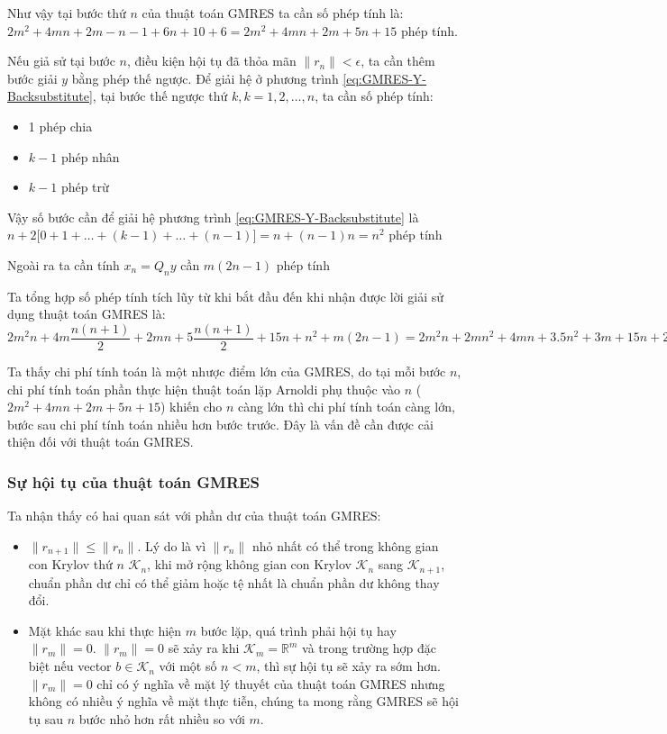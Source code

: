\documentclass[14pt, a4paper]{article}
\numberwithin{equation}{section}
\numberwithin{algorithm}{section}
\numberwithin{figure}{section}
\numberwithin{dl}{section}
\numberwithin{md}{section}
\numberwithin{bd}{section}
\begin{document}
Như vậy tại bước thứ $n$ của thuật toán GMRES ta cần số phép tính là: $2m^2+4mn+2m-n-1 + 6n+10 + 6=2m^2+4mn+2m+5n+15$ phép tính.

Nếu giả sử tại bước $n$, điều kiện hội tụ đã thỏa mãn $\lVert r_n \rVert < \epsilon$, ta cần thêm bước giải $y$ bằng phép thế ngược. Để giải hệ ở phương trình \ref{eq:GMRES-Y-Backsubstitute}, tại bước thế ngược thứ $k, k=1,2,\dots,n$, ta cần số phép tính:
\begin{itemize}
    \item 1 phép chia
    \item $k-1$ phép nhân
    \item $k-1$ phép trừ
\end{itemize}

Vậy số bước cần để giải hệ phương trình \ref{eq:GMRES-Y-Backsubstitute} là $n + 2\lbrack 0 + 1 + \dots + (k-1) + \dots + (n-1)\rbrack=n+(n-1)n=n^2$ phép tính

Ngoài ra ta cần tính $x_n = Q_n y$ cần $m(2n-1)$ phép tính

Ta tổng hợp số phép tính tích lũy từ khi bắt đầu đến khi nhận được lời giải sử dụng thuật toán GMRES là: $2m^2 n + 4m\dfrac{n(n+1)}{2}+2mn + 5\dfrac{n(n+1)}{2}+15n+n^2+m(2n-1)=2m^2 n + 2mn^2+4mn+3.5n^2+3m+15n+2.5 \sim O(2m^2n+ 2mn^2)$

Ta thấy chi phí tính toán là một nhược điểm lớn của GMRES, do tại mỗi bước $n$, chi phí tính toán phần thực hiện thuật toán lặp Arnoldi phụ thuộc vào $n$ ($2m^2+4mn+2m+5n+15$) khiến cho $n$ càng lớn thì chi phí tính toán càng lớn, bước sau chi phí tính toán nhiều hơn bước trước. Đây là vấn đề cần được cải thiện đối với thuật toán GMRES.

\subsubsection{Sự hội tụ của thuật toán GMRES}

Ta nhận thấy có hai quan sát với phần dư của thuật toán GMRES:

\begin{itemize}
    \item $ \lVert r_{n+1} \rVert \leq \lVert r_{n} \rVert $. Lý do là vì $\lVert r_n \rVert$ nhỏ nhất có thể trong không gian con Krylov thứ $n$ $\mathcal{K}_n$, khi mở rộng không gian con Krylov $\mathcal{K}_n$ sang $\mathcal{K}_{n+1}$, chuẩn phần dư chỉ có thể giảm hoặc tệ nhất là chuẩn phần dư không thay đổi.
    \item Mặt khác sau khi thực hiện $m$ bước lặp, quá trình phải hội tụ hay $\lVert r_m \rVert=0$. $\lVert r_m \rVert = 0$ sẽ xảy ra khi $\mathcal{K}_m = \mathbb{R}^m$ và trong trường hợp đặc biệt nếu vector $b \in \mathcal{K}_n$ với một số $n < m$, thì sự hội tụ sẽ xảy ra sớm hơn. $\lVert r_m \rVert = 0$ chỉ có ý nghĩa về mặt lý thuyết của thuật toán GMRES nhưng không có nhiều ý nghĩa về mặt thực tiễn, chúng ta mong rằng GMRES sẽ hội tụ sau $n$ bước nhỏ hơn rất nhiều so với $m$.
\end{itemize}
\end{document}

